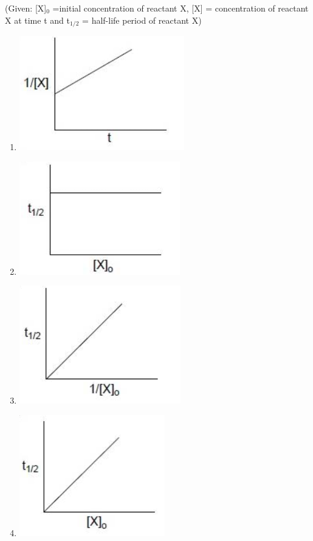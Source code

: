 \documentclass[journal,12pt,onecolumn]{IEEEtran}
\begin{document}
\begin{enumerate}
(Given: [X]$_0$ =initial concentration of reactant X, [X] = concentration of reactant X at time t and t$_{1/2}$ = half-life period of reactant X)
    \begin{enumerate}
	    \item \includegraphics{15a}
	    \item \includegraphics{15b}
	    \item \includegraphics{15c}
	    \item \includegraphics{15d}
    \end{enumerate}

\end{enumerate}
\end{document}
